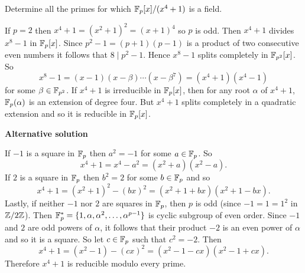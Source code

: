 \begin{ex}{22.15}
    Determine all the primes for which $\mathbb{F}_p[x]/(x^4+1)$ is a field. 
\end{ex}
\begin{sol}
    If $p=2$ then $x^4+1=(x^2+1)^2=(x+1)^4$ so $p$ is odd. 
    Then $x^4+1$ divides $x^8-1$ in $\mathbb{F}_p[x]$. 
    Since $p^2-1=(p+1)(p-1)$ is a product of two consecutive even numbers it follows that $8\mid p^2-1$.
    Hence $x^8-1$ splits completely in $\mathbb{F}_{p^2}[x]$. So
    $$x^8-1=(x-1)(x-\beta)\cdots(x-\beta^7)=(x^4+1)(x^4-1)$$
    for some $\beta\in\mathbb{F}_{p^2}$. 
    If $x^4+1$ is irreducible in $\mathbb{F}_p[x]$, then for any root $\alpha$ of $x^4+1$, $\mathbb{F}_p(\alpha)$ is an extension of degree four.
    But $x^4+1$ splits completely in a quadratic extension and so it is reducible in $\mathbb{F}_p[x]$.

    \noindent\textbf{Alternative solution}
    
    If $-1$ is a square in $\mathbb{F}_p$ then $a^2=-1$ for some $a\in\mathbb{F}_p$. So
    $$x^4+1=x^4-a^2=(x^2+a)(x^2-a).$$
    If $2$ is a square in $\mathbb{F}_p$ then $b^2=2$ for some $b\in\mathbb{F}_p$ and so
    $$x^4+1=(x^2+1)^2-(bx)^2=(x^2+1+bx)(x^2+1-bx).$$
    Lastly, if neither $-1$ nor $2$ are squares in $\mathbb{F}_p$, then $p$ is odd (since $-1=1=1^2$ in $\mathbb{Z}/2\mathbb{Z}$).
    Then $\mathbb{F}_p^*=\{1,\alpha, \alpha^2,\dots,\alpha^{p-1}\}$ is cyclic subgroup of even order. 
    Since $-1$ and $2$ are odd powers of $\alpha$, it follows that their product $-2$ is an even power of $\alpha$ and so it is a square.
    So let $c\in\mathbb{F}_p$ such that $c^2=-2$. Then
    $$x^4+1=(x^2-1)-(cx)^2=(x^2-1-cx)(x^2-1+cx).$$
    Therefore $x^4+1$ is reducible modulo every prime.
\end{sol}